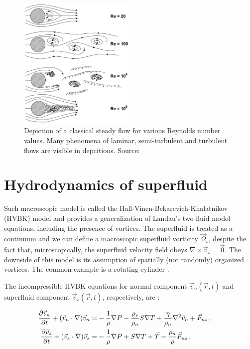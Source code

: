 \begin{figure}[h]
	\centering
	\includegraphics[width=0.5\textwidth]{graphics/theory/laminar-turbulent}
	\caption{Depiction of a classical steady flow for various Reynolds number values. Many phenomena of laminar, semi-turbulent and turbulent flows are visible in depcitions. Source: \cite{laminar-turbulence}}
	\label{laminar-turbulent}
\end{figure}


\section{Hydrodynamics of superfluid}

Such macroscopic model is called the Hall-Vinen-Bekarevich-Khalatnikov (HVBK) model and provides a generalization of Landau's two-fluid model equations, including the presence of vortices. The superfluid is treated as a continuum and we can define a macroscopic superfluid vorticity $\vec{\Omega}_s$, despite the fact that, microscopically, the superfluid velocity field obeys $\nabla \times \vec{v}_s = \vec{0}$. The downside of this model is its assumption of spatially (not randomly) organized vortices. The common example is a rotating cylinder \cite{osborne}.\\

\newpage

The incompressible HVBK equations for normal component $\vec{v}_n (\vec{r}, t)$ and superfluid component $\vec{v}_s (\vec{r}, t)$, respectively, are \cite{barenghi}:

\begin{align}
\frac{\partial\vec{v}_n}{\partial t} + (\vec{v}_n\cdot \nabla)\vec{v}_n =& -\frac{1}{\rho} \nabla P - \frac{\rho_s}{\rho_n} S \nabla T + \frac{\eta}{\rho_n} \nabla^2 \vec{v}_n + \vec{F}_{ns}\,,
\label{motion_normal}\\
\frac{\partial\vec{v}_s}{\partial t} + (\vec{v}_s\cdot \nabla)\vec{v}_s =& -\frac{1}{\rho} \nabla P + S \nabla T + \vec{T} - \frac{\rho_n}{\rho} \vec{F}_{ns}\,,
\hspace{15mm}
\label{motion_super}
\end{align}

